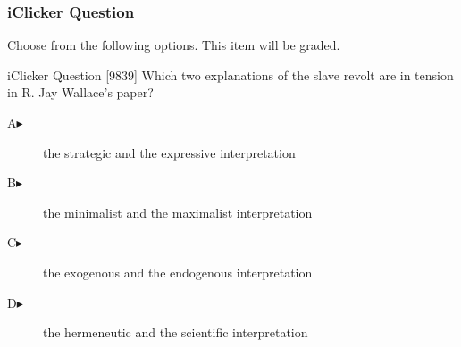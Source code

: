 \begin{frame}
  \frametitle{iClicker Question}
Choose from the following options. This item will be graded.
\begin{block}{iClicker Question}
[9839] Which two explanations of the slave revolt are in tension in R. Jay Wallace's paper?
\end{block}
\begin{description}
\item[A\hspace{.2in}$\blacktriangleright$] the strategic and the expressive interpretation
\item[B\hspace{.2in}$\blacktriangleright$] the minimalist and the maximalist interpretation
\item[C\hspace{.2in}$\blacktriangleright$] the exogenous and the endogenous interpretation
\item[D\hspace{.2in}$\blacktriangleright$] the hermeneutic and the scientific interpretation
\end{description}
\end{frame}